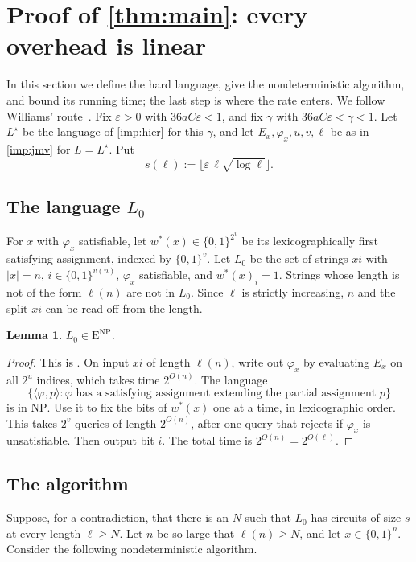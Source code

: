 \documentclass[10pt]{amsart}
\theoremstyle{plain}
\newtheorem{lemma}[theorem]{Lemma}
\theoremstyle{definition}
\theoremstyle{remark}
\numberwithin{equation}{section}
\newcommand{\ENP}{\mathrm{E}^{\mathrm{NP}}}
\begin{document}
\section{Proof of \texorpdfstring{\cref{thm:main}}{Theorem 1.1}: every overhead is linear}\label{sec:proof}

In this section we define the hard language, give the nondeterministic algorithm, and bound its
running time; the last step is where the rate enters. We follow Williams'
route~\cite[Lemma~3.2, Theorem~6.1]{Wil13}. Fix $\varepsilon>0$ with $36aC\varepsilon<1$, and fix
$\gamma$ with $36aC\varepsilon<\gamma<1$. Let $L^\star$ be the language of \cref{imp:hier} for this
$\gamma$, and let $E_x,\varphi_x,u,v,\ell$ be as in \cref{imp:jmv} for $L=L^\star$. Put
\[
  s(\ell):=\bigl\lfloor\varepsilon\,\ell\sqrt{\log\ell}\bigr\rfloor .
\]

\subsection{The language \texorpdfstring{$L_0$}{L0}}
For $x$ with $\varphi_x$ satisfiable, let $w^\ast(x)\in\{0,1\}^{2^{v}}$ be its lexicographically
first satisfying assignment, indexed by $\{0,1\}^{v}$. Let $L_0$ be the set of strings $xi$ with
$|x|=n$, $i\in\{0,1\}^{v(n)}$, $\varphi_x$ satisfiable, and $w^\ast(x)_i=1$. Strings whose length is
not of the form $\ell(n)$ are not in $L_0$. Since $\ell$ is strictly increasing, $n$ and the
split $xi$ can be read off from the length.

\begin{lemma}\label{lem:enp}
$L_0\in\ENP$.
\end{lemma}

\begin{proof}
This is \cite[Lemma~3.2]{Wil13}. On input $xi$ of length $\ell(n)$, write out $\varphi_x$ by
evaluating $E_x$ on all $2^u$ indices, which takes time $2^{O(n)}$. The language
\[
  \{\langle\varphi,p\rangle:\varphi\text{ has a satisfying assignment extending the partial assignment }p\}
\]
is in $\mathrm{NP}$. Use it to fix the bits of $w^\ast(x)$ one at a time, in
lexicographic order. This takes $2^{v}$ queries of length $2^{O(n)}$, after one query that rejects
if $\varphi_x$ is unsatisfiable. Then output bit $i$. The total time is $2^{O(n)}=2^{O(\ell)}$.
\end{proof}

\subsection{The algorithm}
Suppose, for a contradiction, that there is an $N$ such that $L_0$ has circuits of size $s$ at every
length $\ell\ge N$. Let $n$ be so large that $\ell(n)\ge N$, and let $x\in\{0,1\}^n$. Consider the
following nondeterministic algorithm.
\end{document}
